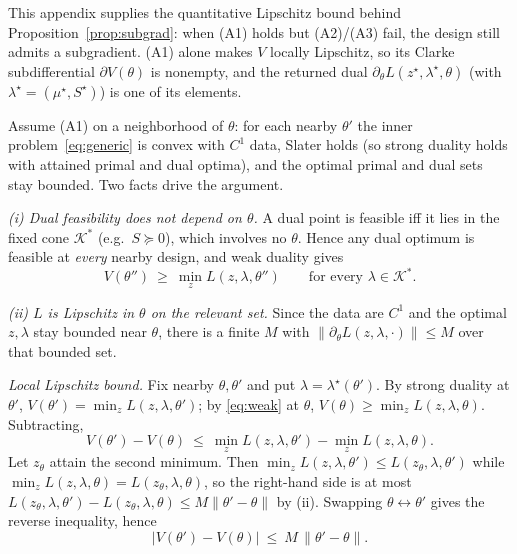 \documentclass[twocolumn,amsthm]{autart}
\begin{document}
This appendix supplies the quantitative Lipschitz bound behind
Proposition~\ref{prop:subgrad}: when (A1) holds but (A2)/(A3) fail, the design still
admits a subgradient. (A1) alone makes
$V$ locally Lipschitz, so its Clarke subdifferential $\partial V(\theta)$ is nonempty,
and the returned dual $\partial_\theta L(z^\star,\lambda^\star,\theta)$ (with
$\lambda^\star=(\mu^\star,S^\star)$) is one of its elements.

Assume (A1) on a neighborhood of $\theta$: for each nearby $\theta'$ the inner
problem~\eqref{eq:generic} is convex with $C^1$ data, Slater holds (so strong duality
holds with attained primal and dual optima), and the optimal primal and dual sets stay
bounded. Two facts drive the argument.

\emph{(i) Dual feasibility does not depend on $\theta$.} A dual point is feasible iff it
lies in the fixed cone $\mathcal K^\ast$ (e.g.\ $S\succeq0$), which involves no $\theta$.
Hence any dual optimum is feasible at \emph{every} nearby design, and weak duality gives
\begin{equation}\label{eq:weak}
V(\theta'')\ \ge\ \min_z L(z,\lambda,\theta'')\qquad\text{for every }\lambda\in\mathcal K^\ast .
\end{equation}

\emph{(ii) $L$ is Lipschitz in $\theta$ on the relevant set.} Since the data are $C^1$
and the optimal $z,\lambda$ stay bounded near $\theta$, there is a finite $M$ with
$\|\partial_\theta L(z,\lambda,\cdot)\|\le M$ over that bounded set.

\emph{Local Lipschitz bound.} Fix nearby $\theta,\theta'$ and put
$\lambda=\lambda^\star(\theta')$. By strong duality at $\theta'$,
$V(\theta')=\min_z L(z,\lambda,\theta')$; by \eqref{eq:weak} at $\theta$,
$V(\theta)\ge\min_z L(z,\lambda,\theta)$. Subtracting,
\begin{equation*}
V(\theta')-V(\theta)\ \le\ \min_z L(z,\lambda,\theta')-\min_z L(z,\lambda,\theta).
\end{equation*}
Let $z_\theta$ attain the second minimum. Then $\min_z L(z,\lambda,\theta')\le
L(z_\theta,\lambda,\theta')$ while $\min_z L(z,\lambda,\theta)=L(z_\theta,\lambda,\theta)$,
so the right-hand side is at most $L(z_\theta,\lambda,\theta')-L(z_\theta,\lambda,\theta)
\le M\|\theta'-\theta\|$ by (ii). Swapping $\theta\leftrightarrow\theta'$ gives the
reverse inequality, hence
\begin{equation}\label{eq:lip}
|V(\theta')-V(\theta)|\ \le\ M\,\|\theta'-\theta\| .
\end{equation}
\end{document}
